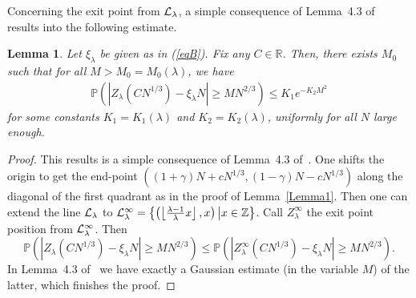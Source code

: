 \documentclass[12pt,a4paper]{article}
\numberwithin{equation}{section}
\newcommand{\Pb}{\mathbb{P}}
\newcommand{\R}{\mathbb{R}}
\newcommand{\Z}{\mathbb{Z}}
\newtheorem{lem}[prop]{Lemma}
\begin{document}
Concerning the exit point from ${\cal L}_\lambda$, a simple consequence of Lemma~4.3 of~\cite{FO17v1} results into the following estimate.
\begin{lem}\label{ExitPointOfGeneralPercolation}
Let $\xi_\lambda$ be given as in (\ref{eqB}). Fix any $C\in \R$. Then, there exists $M_0$ such that for all $M>M_0=M_0(\lambda)$, we have
 \begin{align}\label{eq:ExitPointProbabilityDecay}
 \Pb\left(\left|Z_\lambda(CN^{1/3})-\xi_\lambda N\right|\geq MN^{2/3}\right) \leq K_1e^{-K_2M^2}
\end{align}
for some constants $K_1=K_1(\lambda)$ and $K_2=K_2(\lambda)$, uniformly for all $N$ large enough.
\end{lem}
\begin{proof}
This results is a simple consequence of Lemma~4.3 of~\cite{FO17v1}. One shifts the origin to get the end-point $((1+\gamma)N+cN^{1/3},(1-\gamma)N-c N^{1/3})$ along the diagonal of the first quadrant as in the proof of Lemma~\ref{Lemma1}. Then one can extend the line ${\cal L}_\lambda$ to ${\cal L}_\lambda^\infty =\left\{\left(\left\lfloor\tfrac{\lambda-1}{\lambda} x\right\rfloor, x\right)\big| x\in \Z\right\}$. Call $Z^{\infty}_{\lambda}$ the exit point position from ${\cal L}_\lambda^\infty$. Then
\begin{equation}
\Pb\left(\left|Z_\lambda(CN^{1/3})-\xi_\lambda N\right|\geq MN^{2/3}\right) \leq \Pb\left(\left|Z^{\infty}_{\lambda}(CN^{1/3})-\xi_\lambda N\right|\geq MN^{2/3}\right).
\end{equation}
In Lemma~4.3 of~\cite{FO17v1} we have exactly a Gaussian estimate (in the variable $M$) of the latter, which finishes the proof.
\end{proof}
\end{document}
